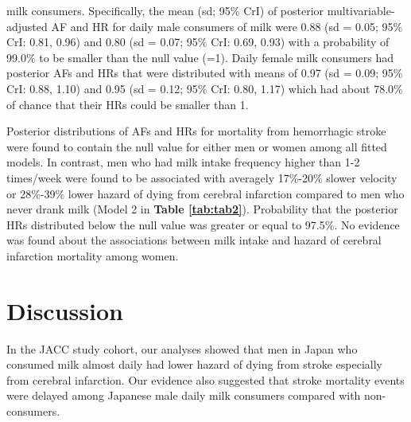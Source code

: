 \documentclass[nutrients,article,submitted,moreauthors,pdftex]{mdpi}
\begin{document}
\noindent milk consumers. Specifically, the mean (sd; 95\% CrI) of
posterior multivariable-adjusted AF and HR for daily male consumers of
milk were 0.88 (sd = 0.05; 95\% CrI: 0.81, 0.96) and 0.80 (sd = 0.07;
95\% CrI: 0.69, 0.93) with a probability of 99.0\% to be smaller than
the null value (=1). Daily female milk consumers had posterior AFs and
HRs that were distributed with means of 0.97 (sd = 0.09; 95\% CrI: 0.88,
1.10) and 0.95 (sd = 0.12; 95\% CrI: 0.80, 1.17) which had about 78.0\%
of chance that their HRs could be smaller than 1.

Posterior distributions of AFs and HRs for mortality from hemorrhagic
stroke were found to contain the null value for either men or women
among all fitted models. In contrast, men who had milk intake frequency
higher than 1-2 times/week were found to be associated with averagely
17\%-20\% slower velocity or 28\%-39\% lower hazard of dying from
cerebral infarction compared to men who never drank milk (Model 2 in
\textbf{Table \ref{tab:tab2}}). Probability that the posterior HRs
distributed below the null value was greater or equal to 97.5\%. No
evidence was found about the associations between milk intake and hazard
of cerebral infarction mortality among women.

\hypertarget{discussion}{%
\section{Discussion}\label{discussion}}

In the JACC study cohort, our analyses showed that men in Japan who
consumed milk almost daily had lower hazard of dying from stroke
especially from cerebral infarction. Our evidence also suggested that
stroke mortality events were delayed among Japanese male daily milk
consumers compared with non-consumers.
\end{document}

